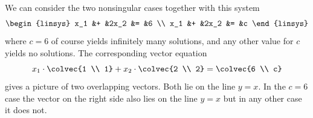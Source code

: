 \begin{ans}{7}
      We can consider the two nonsingular cases together with this
      system
      \begin{equation*}
        \begin{linsys}{2}
           x_1  &+  &2x_2  &=  &6  \\
           x_1  &+  &2x_2  &=  &c
        \end{linsys}
      \end{equation*}
      where $c=6$ of course yields infinitely many solutions, and any other
      value for $c$ yields no solutions.
      The corresponding vector equation
      \begin{equation*}
        x_1\cdot\colvec{1 \\ 1}+x_2\cdot\colvec{2 \\ 2}=\colvec{6 \\ c}
      \end{equation*}
      gives a picture of two overlapping vectors.
      Both lie on the line $y=x$.
      In the $c=6$ case the vector on the right side also lies on
      the line $y=x$ but in any other case it does not.
    
\end{ans}
